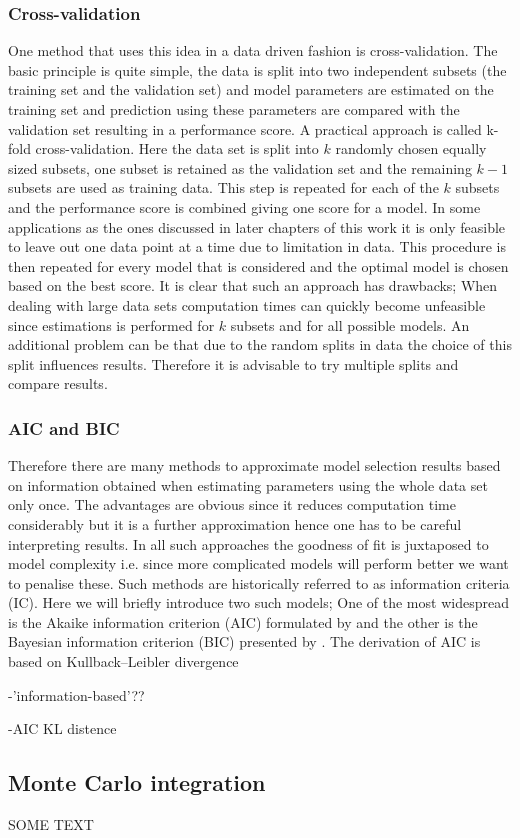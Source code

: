 \subsubsection{Cross-validation}
\label{sec:cross-validation}

One method that uses this idea in a data driven fashion is cross-validation. The basic principle is quite simple, the data is split into two independent subsets (the training set and the validation set) and model parameters are estimated on the training set and prediction using these parameters are compared with the validation set resulting in a performance score. A practical approach is called k-fold cross-validation. Here the data set is split into $k$ randomly chosen equally sized subsets, one subset is retained as the validation set and the remaining $k-1$ subsets are used as training data. This step is repeated for each of the $k$ subsets and the performance score is combined giving one score for a model. In some applications as the ones discussed in later chapters of this work it is only feasible to leave out one data point at a time due to limitation in data. This procedure is then repeated for every model that is considered and the optimal model is chosen based on the best score. It is clear that such an approach has drawbacks; When dealing with large data sets computation times can quickly become unfeasible since estimations is performed for $k$ subsets and for all possible models. An additional problem can be that due to the random splits in data the choice of this split influences results. Therefore it is advisable to try multiple splits and compare results.

\subsubsection{AIC and BIC}
\label{sec:aic}

Therefore there are many methods to approximate model selection results based on information obtained when estimating parameters using the whole data set only once. The advantages are obvious since it reduces computation time considerably but it is a further approximation hence one has to be careful interpreting results. In all such approaches the goodness of fit is juxtaposed to model complexity i.e. since more complicated models will perform better we want to penalise these. Such methods are historically referred to as information criteria (IC). Here we will briefly introduce two such models; One of the most widespread is the Akaike information criterion (AIC) formulated by \cite{Akaike:1974ih} and the other is the Bayesian information criterion (BIC) presented by \cite{Schwarz:1978uv}. The derivation of AIC is based on Kullback–Leibler divergence 

-'information-based'??

-AIC KL distence




\subsection{Monte Carlo integration}
\label{sec:monte-carlo-integr}

SOME TEXT





